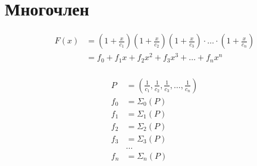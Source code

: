 
\section{Многочлен}

\begin{equation*} \begin{aligned}
F(x) &= 
\left(1 + \frac{x}{c_1} \right) 
\left(1 + \frac{x}{c_2} \right) 
\left(1 + \frac{x}{c_3} \right) 
\cdot \ldots \cdot
\left(1 + \frac{x}{c_n} \right) \\ &=
f_0 + f_1 x + f_2 x^2 + f_3 x^3 + \ldots + f_n x^n \\
\end{aligned} \end{equation*}

\begin{equation*} \begin{aligned}
P &=
\left(
\frac{1}{c_1},
\frac{1}{c_2},
\frac{1}{c_3},
{} \ldots,
\frac{1}{c_n}
\right) \\
f_0 &= \Sigma_0(P) \\ 
f_1 &= \Sigma_1(P) \\
f_2 &= \Sigma_2(P) \\
f_3 &= \Sigma_3(P) \\
&\ldots \\
f_n &= \Sigma_n(P) \\
\end{aligned} \end{equation*}
